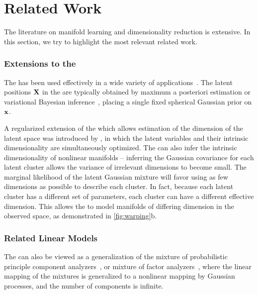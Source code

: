 \section{Related Work}
\label{sec:iwmm-related-work}

The literature on manifold learning and dimensionality reduction is extensive.
In this section, we try to highlight the most relevant related work.

\subsubsection{Extensions to the \sgplvm{}}

The \gplvm{} has been used effectively in a wide variety of applications~\citep{lawrence2004gaussian,salzmann2008local,lawrence2009non}.
The latent positions $\mathbf{X}$ in the \gplvm{} are typically obtained by maximum a posteriori estimation or variational Bayesian inference~\citep{titsias2010bayesian}, placing a single fixed spherical Gaussian prior on ${\bf{x}}$.

A regularized extension of the \gplvm{} which allows estimation of the dimension of the latent space was introduced by \citet{geiger2009rank}, in which the latent variables and their intrinsic dimensionality are simultaneously optimized.
The \iwmm{} can also infer the intrinsic dimensionality of nonlinear manifolds -- inferring the Gaussian covariance for each latent cluster allows the variance of irrelevant dimensions to become small.
The marginal likelihood of the latent Gaussian mixture will favor using as few dimensions as possible to describe each cluster.
In fact, because each latent cluster has a different set of parameters, each cluster can have a different effective dimension.
This allows the \iwmm{} to model manifolds of differing dimension in the observed space, as demonstrated in \cref{fig:warping}{b}.

\subsubsection{Related Linear Models}

The \iwmm{} can also be viewed as a generalization of the mixture of probabilistic principle component analyzers~\citep{tipping1999mixtures}, or mixture of factor analyzers~\citep{ghahramani2000variational}, where the linear mapping of the mixtures is generalized to a nonlinear mapping by Gaussian processes, and the number of components is infinite.%

